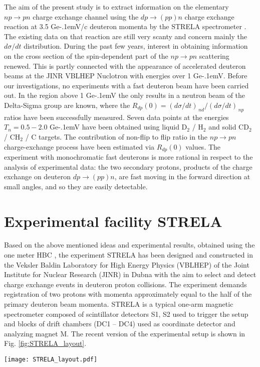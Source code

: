 \documentclass[twocolumn,epjc3]{svjour3}
\newcommand{\np}     {\ensuremath{np \rightarrow pn}\xspace}
\newcommand{\dpchex} {\ensuremath{dp \rightarrow (pp)n}\xspace}
\newcommand{\GeVc}   {Ge\kern-.1emV/c\xspace}
\newcommand{\GeV}    {Ge\kern-.1emV\xspace}
\begin{document}
The aim of the present study is to extract information on the elementary \np
charge exchange channel using the \dpchex charge exchange reaction at 3.5 \GeVc
deuteron momenta by the STRELA spectrometer \cite{gla13}. The existing data on
that reaction are still very scanty and concern mainly the $d\sigma/dt$
distribution. During the past few years, interest in obtaining information on
the cross section of the spin-dependent part of the \np scattering renewed. This
is partly connected with the appearance of accelerated deuteron beams at the
JINR VBLHEP Nuclotron with energies over 1 \GeV. Before our investigations, no
experiments with a fast deuteron beam have been carried out. In the region above
1 \GeV the only results in a neutron beam of the Delta-Sigma group
\cite{sha09,sha09_2,shi11} are known, where the
$R_{dp}(0) = (d\sigma/dt)_{\,nd} / (d\sigma/dt)_{\,np}$ ratios have been
successfully measured. Seven data points at the energies $T_n = 0.5 - 2.0$ \GeV
have been obtained using liquid D$_2$ / H$_2$ and solid CD$_2$ / CH$_2$ / C
targets. The contribution of non-flip to flip ratio in the \np charge-exchange
process have been estimated via $R_{dp}(0)$ values. The experiment with
monochromatic fast deuterons is more rational in respect to the analysis of
experimental data: the two secondary protons, products of the charge exchange on
deuteron \dpchex, are fast moving in the forward direction at small angles,
and so they are easily detectable.

\section{Experimental facility STRELA}
Based on the above mentioned ideas and experimental results, obtained using the
one meter HBC \cite{gla02,gla08}, the experiment STRELA has been designed and
constructed in the Veksler Baldin Laboratory for High Energy Physics (VBLHEP) of
the Joint Institute for Nuclear Research (JINR) in Dubna with the aim to select
and detect charge exchange events in deuteron proton collisions. The experiment
demands registration of two protons with momenta approximately equal to the half
of the primary deuteron beam momenta. STRELA is a typical one-arm magnetic
spectrometer composed of scintillator detectors S1, S2 used to trigger the
setup and blocks of drift chambers (DC1 -- DC4) used as coordinate detector and
analyzing magnet M. The recent version of the experimental setup is shown in
Fig. \ref{fig:STRELA_layout}.

\begin{figure*}[t] %
  \centering
  \texttt{[image: STRELA\_layout.pdf]}
  \caption{Layout of the experimental setup for determining the spin-dependent
    part of \np scattering: scintillator counters S1 and S2, drift chambers
    (DC1 -- DC4), analyzing magnet M and target T.}
  \label{fig:STRELA_layout}
\end{figure*}
\end{document}

